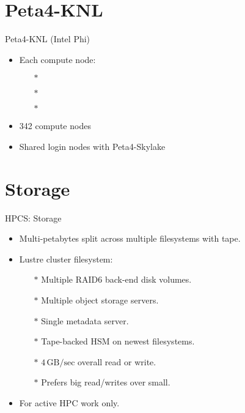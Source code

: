 \section{Peta4-KNL}
\begin{frame}{Peta4-KNL (Intel Phi)}
\begin{itemize}
\item{Each compute node:}
\begin{itemize}
\item[$\ast$]{}
\item[$\ast$]{}
\item[$\ast$]{}
\end{itemize}
\item{342 compute nodes}
\item{Shared login nodes with Peta4-Skylake}
\end{itemize}
\end{frame}



\section{Storage}
\begin{frame}{HPCS: Storage}
\begin{itemize}
\item{Multi-petabytes split across multiple filesystems with tape.}
\item{Lustre cluster filesystem:}
\begin{itemize}
\item[$\ast$]{Multiple RAID6 back-end disk volumes.}
\item[$\ast$]{Multiple object storage servers.}
\item[$\ast$]{Single metadata server.}
\item[$\ast$]{Tape-backed HSM on newest filesystems.}
\pause
\item[$\ast$]{\alert{$4\,\text{GB/sec}$ overall read or write.}}
\pause
\item[$\ast$]{\alert{Prefers big read/writes over small.}}
\end{itemize}
\pause
\item{\alert{For active HPC work only.}}
\end{itemize}
\end{frame}

